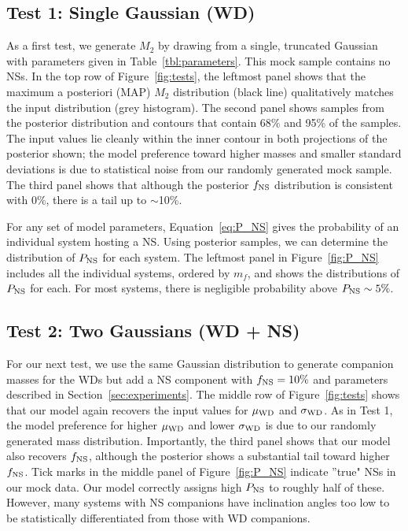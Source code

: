 \documentclass[apjl]{emulateapj}
\newcommand{\mf}{m_f}
\begin{document}
\subsection{Test 1: Single Gaussian (WD)} \label{sec:exp1}

As a first test, we generate $M_2$ by drawing from a single, truncated Gaussian with parameters given in Table~\ref{tbl:parameters}. This mock sample contains no NSs. In the top row of Figure~\ref{fig:tests}, the leftmost panel shows that the maximum a posteriori (MAP) $M_2$ distribution (black line) qualitatively matches the input distribution (grey histogram). The second panel shows samples from the posterior distribution and contours that contain 68\% and 95\% of the samples. The input values lie cleanly within the inner contour in both projections of the posterior shown; the model preference toward higher masses and smaller standard deviations is due to statistical noise from our randomly generated mock sample. The third panel shows that although the posterior $f_{\rm NS}$ distribution is consistent with 0\%, there is a tail up to $\sim$10\%. 

For any set of model parameters, Equation~\ref{eq:P_NS} gives the probability of an individual system hosting a NS. Using posterior samples, we can determine the distribution of $P_{\rm NS}$ for each system. The leftmost panel in Figure~\ref{fig:P_NS} includes all the individual systems, ordered by $\mf$, and shows the distributions of $P_{\rm NS}$ for each. For most systems, there is negligible probability above $P_{\rm NS}\sim 5\%$.



\subsection{Test 2: Two Gaussians (WD + NS)} \label{sec:exp2}
For our next test, we use the same Gaussian distribution to generate companion masses for the WDs but add a NS component with $f_{\rm NS} = 10\%$ and parameters described in Section~\ref{sec:experiments}. The middle row of Figure~\ref{fig:tests} shows that our model again recovers the input values for $\mu_{\rm WD}$ and $\sigma_{\rm WD}$. As in Test 1, the model preference for higher $\mu_{\rm WD}$ and lower $\sigma_{\rm WD}$ is due to our randomly generated mass distribution. Importantly, the third panel shows that our model also recovers $f_{\rm NS}$, although the posterior shows a substantial tail toward higher $f_{\rm NS}$. Tick marks in the middle panel of Figure~\ref{fig:P_NS} indicate ''true" NSs in our mock data. Our model correctly assigns high $P_{\rm NS}$ to roughly half of these. However, many systems with NS companions have inclination angles too low to be statistically differentiated from those with WD companions.
\end{document}

